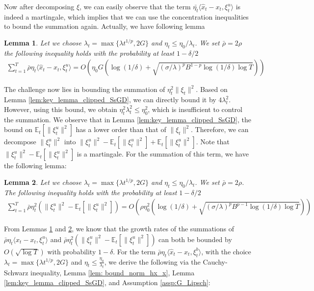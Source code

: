 \documentclass{article}
\newtheorem{lemma}{Lemma}
\def \E {\mathbb{E}}
\begin{document}
Now after decomposing $\xi$, we can easily observe that the term $\bar{\eta_t}\langle\hat{x}_t-x_t,\xi_t^u\rangle$ is indeed a martingale, which implies that we can use the concentration inequalities to bound the summation again. Actually, we have following lemma
\begin{lemma}\label{lem: clipped_SsGD_HPB1_anytime}
    Let we choose $\lambda_t=\max\{\lambda t^{1/p},2G\}$ and $\eta_t\leq\eta_0/\lambda_t$. We set $\bar{\rho}=2\rho$ the following inequality holds with the probability at least $1-\delta/2$
    \begin{align}
        \sum_{t=1}^T \bar{\rho}\eta_t\langle \hat{x}_t-x_t, \xi_t^u\rangle = O\left(\eta_0G\left(\log(1/\delta)+\sqrt{(\sigma/\lambda)^pB^{1-p}\log(1/\delta)\log T }\right)\right)
    \end{align}
\end{lemma}
The challenge now lies in bounding the summation of $\eta_t^2\|\xi_t\|^2$. Based on Lemma \ref{lem:key_lemma_clipped_SsGD}, we can directly bound it by $4\lambda_t^2$. However, using this bound, we obtain $\eta_t^2\lambda_t^2 \leq \eta_0^2$, which is insufficient to control the summation. We observe that in Lemma \ref{lem:key_lemma_clipped_SsGD}, the bound on $\mathbb{E}_t[\|\xi_t^u\|^2]$ has a lower order than that of $\|\xi_t\|^2$. Therefore, we can decompose $\|\xi_t^u\|^2$ into $\|\xi_t^u\|^2-\E_t[\|\xi_t^u\|^2]+\E_t[\|\xi_t^u\|^2]$. Note that $\|\xi_t^u\|^2 - \mathbb{E}_t[\|\xi_t^u\|^2]$ is a martingale. For the summation of this term, we have the following lemma:
\begin{lemma}\label{lem:clipped_SsGD_HPB2_any_time}
    Let we choose $\lambda_t=\max\{\lambda t^{1/p},2G\}$ and $\eta_t\leq\eta_0/\lambda_t$. We set $\bar{\rho}=2\rho$. The following inequality holds with the probability at least $1-\delta/2$
    \begin{align}
        \sum_{t=1}^T \bar{\rho}\eta_t^2(\|\xi_t^u\|^2 - \mathbb{E}_t[\|\xi_t^u\|^2]) = O\left(\rho\eta_0^2\left(\log(1/\delta)+\sqrt{(\sigma/\lambda)^pB^{p-1}\log(1/\delta)\log T}\right)\right)
    \end{align}
\end{lemma}
From Lemmas \ref{lem: clipped_SsGD_HPB1_anytime} and \ref{lem:clipped_SsGD_HPB2_any_time}, we know that the growth rates of the summations of $\bar{\rho}\eta_t\langle\hat{x}_t - x_t,\xi_t^u\rangle$ and $\bar{\rho}\eta_t^2(\|\xi_t^u\|^2 - \mathbb{E}_t[\|\xi_t^u\|^2])$ can both be bounded by $O(\sqrt{\log T})$ with probability $1 - \delta$. For the term $\bar{\rho}\eta_t\langle\hat{x}_t - x_t, \xi_t^b\rangle$, with the choice $\lambda_t = \max\{\lambda t^{1/p}, 2G\}$ and $\eta_t \leq \frac{\eta_0}{\lambda_t}$, we derive the following via the Cauchy-Schwarz inequality, Lemma \ref{lem: bound_norm_hx_x}, Lemma \ref{lem:key_lemma_clipped_SsGD}, and Assumption \ref{assp:G_Lipsch}:  
\end{document}
